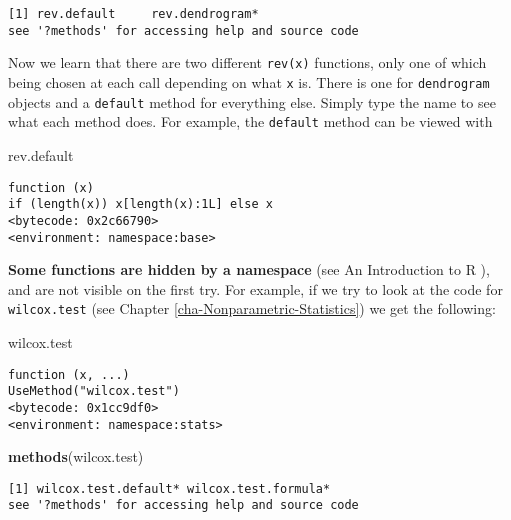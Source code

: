 \documentclass[]{book}
\newenvironment{Shaded}{\begin{snugshade}}{\end{snugshade}}
\newcommand{\KeywordTok}[1]{\textcolor[rgb]{0.13,0.29,0.53}{\textbf{{#1}}}}
\newcommand{\NormalTok}[1]{{#1}}
\numberwithin{equation}{chapter}
\numberwithin{figure}{chapter}
\theoremstyle{plain}
\theoremstyle{definition}
\theoremstyle{remark}
\theoremstyle{definition}
\theoremstyle{definition}
\theoremstyle{remark}
\begin{document}
\begin{verbatim}
[1] rev.default     rev.dendrogram*
see '?methods' for accessing help and source code
\end{verbatim}

Now we learn that there are two different \texttt{rev(x)} functions,
only one of which being chosen at each call depending on what \texttt{x}
is. There is one for \texttt{dendrogram} objects and a \texttt{default}
method for everything else. Simply type the name to see what each method
does. For example, the \texttt{default} method can be viewed with

\begin{Shaded}
\begin{Highlighting}[]
\NormalTok{rev.default}
\end{Highlighting}
\end{Shaded}

\begin{verbatim}
function (x) 
if (length(x)) x[length(x):1L] else x
<bytecode: 0x2c66790>
<environment: namespace:base>
\end{verbatim}

\textbf{Some functions are hidden by a namespace} (see An Introduction
to R \textcite{Venables2010}), and are not visible on the first try. For
example, if we try to look at the code for \texttt{wilcox.test}
 (see Chapter
\ref{cha-Nonparametric-Statistics}) we get the following:

\begin{Shaded}
\begin{Highlighting}[]
\NormalTok{wilcox.test}
\end{Highlighting}
\end{Shaded}

\begin{verbatim}
function (x, ...) 
UseMethod("wilcox.test")
<bytecode: 0x1cc9df0>
<environment: namespace:stats>
\end{verbatim}

\begin{Shaded}
\begin{Highlighting}[]
\KeywordTok{methods}\NormalTok{(wilcox.test)}
\end{Highlighting}
\end{Shaded}

\begin{verbatim}
[1] wilcox.test.default* wilcox.test.formula*
see '?methods' for accessing help and source code
\end{verbatim}
\end{document}
